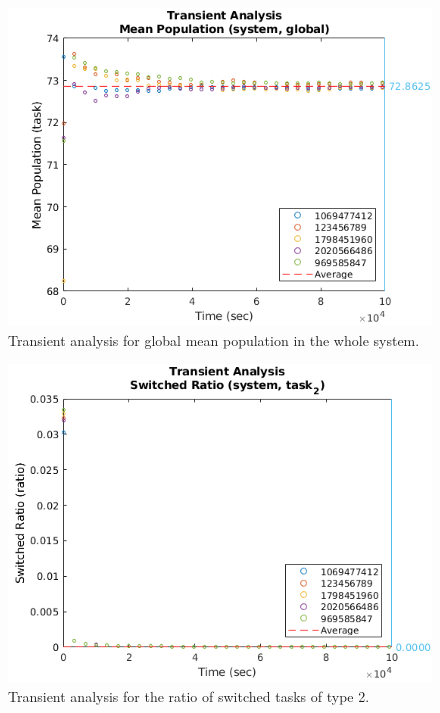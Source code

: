 \begin{figure}
	\includegraphics[width=\columnwidth]{fig/evaluation-transient-analysis-mean-population}
	\caption{Transient analysis for global mean population in the whole system.}
	\label{fig:evaluation-transient-analysis-mean-population}
\end{figure}

\begin{figure}
	\includegraphics[width=\columnwidth]{fig/evaluation-transient-analysis-switched-ratio}
	\caption{Transient analysis for the ratio of switched tasks of type 2.}
	\label{fig:evaluation-transient-analysis-switched-ratio}
\end{figure}

